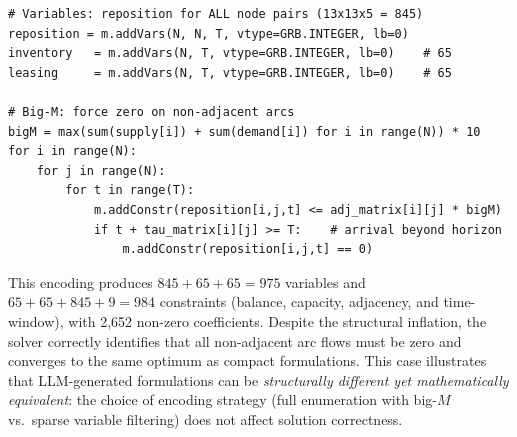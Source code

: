 \documentclass[preprint,12pt]{elsarticle}
\begin{document}
\begin{nolinenumbers}
\begin{promptbox}
\begin{lstlisting}[style=prompttemplate]
# Variables: reposition for ALL node pairs (13x13x5 = 845)
reposition = m.addVars(N, N, T, vtype=GRB.INTEGER, lb=0)
inventory   = m.addVars(N, T, vtype=GRB.INTEGER, lb=0)    # 65
leasing     = m.addVars(N, T, vtype=GRB.INTEGER, lb=0)    # 65

# Big-M: force zero on non-adjacent arcs
bigM = max(sum(supply[i]) + sum(demand[i]) for i in range(N)) * 10
for i in range(N):
    for j in range(N):
        for t in range(T):
            m.addConstr(reposition[i,j,t] <= adj_matrix[i][j] * bigM)
            if t + tau_matrix[i][j] >= T:    # arrival beyond horizon
                m.addConstr(reposition[i,j,t] == 0)
\end{lstlisting}
\end{promptbox}
\label{lst:case-a-expanded}
\end{nolinenumbers}

This encoding produces $845 + 65 + 65 = 975$ variables and $65 + 65 + 845 + 9 = 984$ constraints (balance, capacity, adjacency, and time-window), with 2,652 non-zero coefficients. Despite the structural inflation, the solver correctly identifies that all non-adjacent arc flows must be zero and converges to the same optimum as compact formulations. This case illustrates that LLM-generated formulations can be \emph{structurally different yet mathematically equivalent}: the choice of encoding strategy (full enumeration with big-$M$ vs.\ sparse variable filtering) does not affect solution correctness.

\newpage











\end{document}
